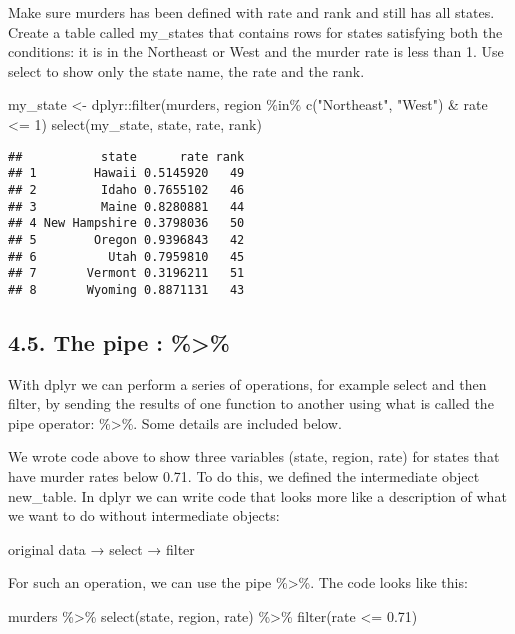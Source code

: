 \documentclass[
]{article}
\newenvironment{Shaded}{\begin{snugshade}}{\end{snugshade}}
\newcommand{\DecValTok}[1]{\textcolor[rgb]{0.00,0.00,0.81}{#1}}
\newcommand{\FloatTok}[1]{\textcolor[rgb]{0.00,0.00,0.81}{#1}}
\newcommand{\FunctionTok}[1]{\textcolor[rgb]{0.00,0.00,0.00}{#1}}
\newcommand{\NormalTok}[1]{#1}
\newcommand{\OtherTok}[1]{\textcolor[rgb]{0.56,0.35,0.01}{#1}}
\newcommand{\SpecialCharTok}[1]{\textcolor[rgb]{0.00,0.00,0.00}{#1}}
\newcommand{\StringTok}[1]{\textcolor[rgb]{0.31,0.60,0.02}{#1}}
\begin{document}
Make sure murders has been defined with rate and rank and still has all
states. Create a table called my\_states that contains rows for states
satisfying both the conditions: it is in the Northeast or West and the
murder rate is less than 1. Use select to show only the state name, the
rate and the rank.

\begin{Shaded}
\begin{Highlighting}[]
\NormalTok{my\_state }\OtherTok{\textless{}{-}}\NormalTok{ dplyr}\SpecialCharTok{::}\FunctionTok{filter}\NormalTok{(murders, region }\SpecialCharTok{\%in\%} \FunctionTok{c}\NormalTok{(}\StringTok{"Northeast"}\NormalTok{, }\StringTok{"West"}\NormalTok{) }\SpecialCharTok{\&}\NormalTok{ rate }\SpecialCharTok{\textless{}=} \DecValTok{1}\NormalTok{)}
\FunctionTok{select}\NormalTok{(my\_state, state, rate, rank)}
\end{Highlighting}
\end{Shaded}

\begin{verbatim}
##           state      rate rank
## 1        Hawaii 0.5145920   49
## 2         Idaho 0.7655102   46
## 3         Maine 0.8280881   44
## 4 New Hampshire 0.3798036   50
## 5        Oregon 0.9396843   42
## 6          Utah 0.7959810   45
## 7       Vermont 0.3196211   51
## 8       Wyoming 0.8871131   43
\end{verbatim}

\hypertarget{the-pipe}{%
\subsection{4.5. The pipe : \%\textgreater\%}\label{the-pipe}}

With dplyr we can perform a series of operations, for example select and
then filter, by sending the results of one function to another using
what is called the pipe operator: \%\textgreater\%. Some details are
included below.

We wrote code above to show three variables (state, region, rate) for
states that have murder rates below 0.71. To do this, we defined the
intermediate object new\_table. In dplyr we can write code that looks
more like a description of what we want to do without intermediate
objects:

original data → select → filter

For such an operation, we can use the pipe \%\textgreater\%. The code
looks like this:

\begin{Shaded}
\begin{Highlighting}[]
\NormalTok{murders }\SpecialCharTok{\%\textgreater{}\%} \FunctionTok{select}\NormalTok{(state, region, rate) }\SpecialCharTok{\%\textgreater{}\%} \FunctionTok{filter}\NormalTok{(rate }\SpecialCharTok{\textless{}=} \FloatTok{0.71}\NormalTok{)}
\end{Highlighting}
\end{Shaded}
\end{document}
